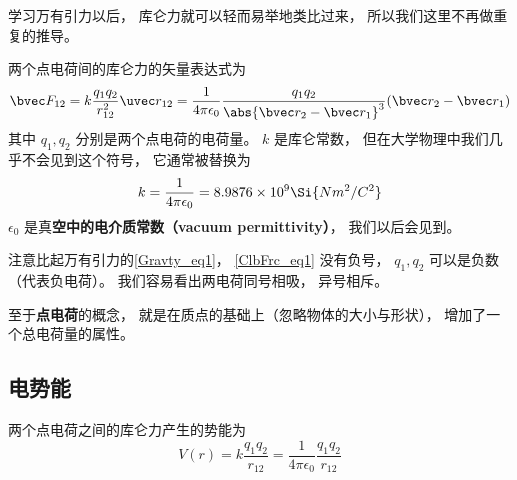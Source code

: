 

学习万有引力以后， 库仑力就可以轻而易举地类比过来， 所以我们这里不再做重复的推导。

两个点电荷间的库仑力的矢量表达式为
\begin{equation}\label{ClbFrc_eq1}
\bvec F_{12} = k\frac{q_1 q_2}{r_{12}^2} \uvec r_{12} = \frac{1}{4\pi\epsilon_0} \frac{q_1 q_2}{\abs{\bvec r_2 - \bvec r_1}^3}(\bvec r_2 - \bvec r_1)
\end{equation}
其中 $q_1, q_2$ 分别是两个点电荷的电荷量。 $k$ 是库仑常数， 但在大学物理中我们几乎不会见到这个符号， 它通常被替换为
\begin{equation}
k = \frac{1}{4\pi\epsilon_0} = 8.9876\times 10^9 \Si{N m^2/C^2}
\end{equation}
$\epsilon_0$ 是真\textbf{空中的电介质常数（vacuum permittivity）}， 我们以后会见到。

注意比起万有引力的\autoref{Gravty_eq1}， \autoref{ClbFrc_eq1} 没有负号， $q_1, q_2$ 可以是负数（代表负电荷）。 我们容易看出两电荷同号相吸， 异号相斥。

至于\textbf{点电荷}的概念， 就是在质点的基础上（忽略物体的大小与形状）， 增加了一个总电荷量的属性。

\subsection{电势能}
两个点电荷之间的库仑力产生的势能为
\begin{equation}
V(r) = k \frac{q_1 q_2}{r_{12}} = \frac{1}{4\pi\epsilon_0} \frac{q_1 q_2}{r_{12}}
\end{equation}


